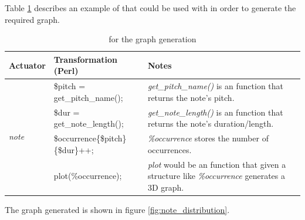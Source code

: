 Table \ref{tab:plot_rules} describes an example of \abcdtrules{} that could be used with \dt{} in
order to generate the required graph.

\begin{center}
  \begin{table}[H]
    \begin{tabular}{|p{2.25cm}|p{7.25cm}|p{5cm}|}
      \hline
      Actuator & Transformation (Perl) & Notes\\
      \hline
      \hline
      \multirow{8}{*}{\emph{note}}
      & \$pitch = get\_pitch\_name(); & \emph{get\_pitch\_name()} is an \abcdt{} function that
      returns the note's pitch.
      \\

      & \$dur = get\_note\_length(); & \emph{get\_note\_length()} is an \abcdt{} function that
      returns the note's duration/length.
      \\

      & \$occurrence\{\$pitch\}\{\$dur\}++; & \emph{\%occurrence} stores the number of
      occurrences.
      \\
      \hline

      \hline
      \emph{-end} & plot(\%occurrence); & \emph{plot} would be an \abcdt{} function that given a
      structure like \emph{\%occurrence} generates a 3D graph.
      \\
      \hline
    \end{tabular}
    \caption{\abcdtrules{} for the graph generation}
    \label{tab:plot_rules}
  \end{table}
\end{center}

The graph generated is shown in figure \ref{fig:note_distribution}.


